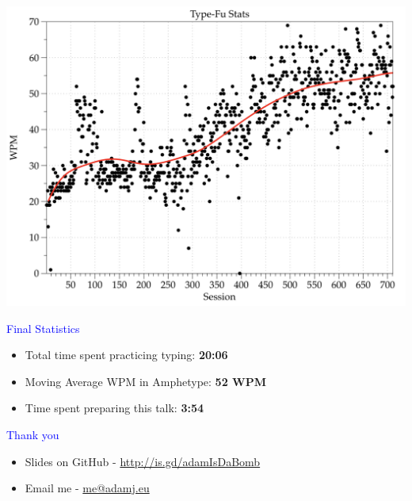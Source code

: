 \documentclass[landscape]{slides}
\begin{document}
\begin{slide}

    \includegraphics[width=\textwidth]{type-fu}

\end{slide}


\begin{slide}

    \textcolor{blue}{\Large{Final Statistics}}

    \begin{itemize}
        \item Total time spent practicing typing: \textbf{20:06}
        \item Moving Average WPM in Amphetype: \textbf{52 WPM}
        \item Time spent preparing this talk: \textbf{3:54}
    \end{itemize}

\end{slide}


\begin{slide}
    \textcolor{blue}{\Large{Thank you}}

    \begin{itemize}
        \item Slides on GitHub - \url{http://is.gd/adamIsDaBomb}
        \item Email me - \url{me@adamj.eu}
    \end{itemize}

\end{slide}
\end{document}
